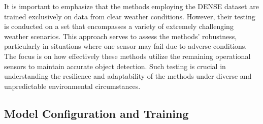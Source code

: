 \documentclass[report.tex]{subfiles}
\begin{document}
\begin{itemize}
            It is important to emphasize that the methods employing the DENSE dataset are trained exclusively on data from clear weather conditions. However, their testing is conducted on a set that encompasses a variety of extremely challenging weather scenarios. This approach serves to assess the methods' robustness, particularly in situations where one sensor may fail due to adverse conditions. The focus is on how effectively these methods utilize the remaining operational sensors to maintain accurate object detection. Such testing is crucial in understanding the resilience and adaptability of the methods under diverse and unpredictable environmental circumstances.

                
        \end{itemize}

        \subsection{Model Configuration and Training}
\end{document}
